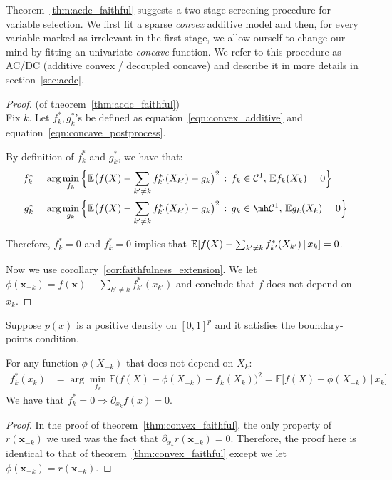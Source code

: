 Theorem~\ref{thm:acdc_faithful} suggests a two-stage screening procedure for variable selection. We first fit a sparse \emph{convex} additive model and then, for every variable marked as irrelevant in the first stage, we allow ourself to change our mind by fitting an univariate \emph{concave} function. We refer to this procedure as AC/DC (additive convex / decoupled concave) and describe it in more details in section~\ref{sec:acdc}.

\begin{proof} (of theorem~\ref{thm:acdc_faithful}) \\
Fix $k$. Let $f^*_k, g^*_k$'s be defined as equation~\ref{eqn:convex_additive} and equation~\ref{eqn:concave_postprocess}.

By definition of $f^*_k$ and $g^*_k$, we have that:
\begin{align*}
f^*_k &= \arg\min_{f_k} \Big\{
   \E\big( f(X) - \sum_{k' \neq k} f^*_{k'}(X_{k'}) - g_k \big)^2 
    \,:\, f_k \in  \mathcal{C}^1,\, \E f_k(X_k) = 0 
  \Big\} \\
g^*_k &= \arg\min_{g_k} \Big\{
   \E\big( f(X) - \sum_{k' \neq k} f^*_{k'}(X_{k'}) - g_k \big)^2 
    \,:\, g_k \in \mh \mathcal{C}^1,\, \E g_k(X_k) = 0 
  \Big\}
\end{align*}

Therefore, $f^*_k = 0$ and $f^*_k = 0$ implies that ${\mathbb E}[ f(X) - \sum_{k'\neq k} f^*_{k'}(X_{k'}) {\,|\,} x_k] = 0$.

Now we use corollary~\ref{cor:faithfulness_extension}. We let $\phi(\mathbf{x}_{-k}) = f(\mathbf{x}) - \sum_{k' \neq k} f^*_{k'} (x_{k'})$ and conclude that $f$ does not depend on $x_k$. 
\end{proof}


\begin{corollary} 
\label{cor:faithfulness_extension}
Suppose $p(x)$ is a positive density on $[0,1]^p$ and it satisfies the boundary-points condition.

For any function $\phi(X_{-k})$ that does not depend on $X_k$:
 \begin{align*}
f^*_k(x_k) &= \arg\min_{f_k} \mathbb{E} \Big( f(X) 
           - \phi(X_{-k}) - f_k(X_k) \Big)^2 
      = \mathbb{E}\Big[ f(X) - \phi(X_{-k}) \,|\, x_k\Big] 
\end{align*}
We have that $ f^*_k = 0 \Rightarrow \partial_{x_k} f(x) = 0$.
\end{corollary}

\begin{proof}
In the proof of theorem~\ref{thm:convex_faithful}, the only property of $r(\mathbf{x}_{-k})$ we used was the fact that $\partial_{x_k} r(\mathbf{x}_{-k}) = 0$. Therefore, the proof here is identical to that of theorem~\ref{thm:convex_faithful} except we let $\phi(\mathbf{x}_{-k})= r(\mathbf{x}_{-k}).$
\end{proof}


